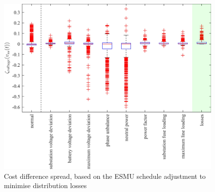 \begin{figure}\centering
	\includegraphics{_chapter1/fig/appendix/minimising-losses}
	\caption{Cost difference spread, based on the ESMU schedule adjustment to minimise distribution losses}
\end{figure}